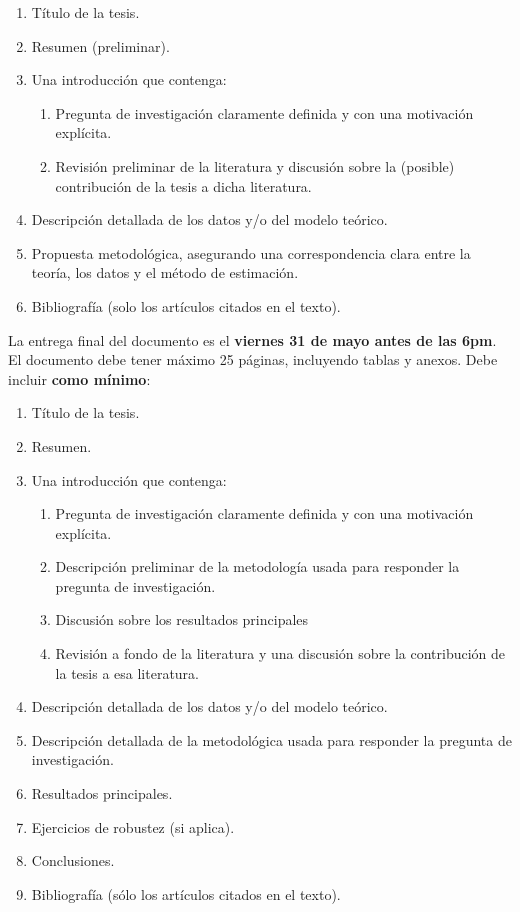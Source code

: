\documentclass[12pt]{article}
\begin{document}
\begin{mdframed}
\begin{enumerate}
    \item Título de la tesis.
    \item Resumen (preliminar).
    \item Una introducción que contenga:
    \begin{enumerate}
        \item Pregunta de investigación claramente definida y con una motivación explícita.
        \item Revisión preliminar de la literatura y discusión sobre la (posible) contribución de la tesis a dicha literatura.
    \end{enumerate}
    \item Descripción detallada de los datos y/o del modelo teórico.
    \item Propuesta metodológica, asegurando una correspondencia clara entre la teoría, los datos y el método de estimación.
    \item Bibliografía (solo los artículos citados en el texto).
\end{enumerate}
\end{mdframed}

La entrega final del documento es el \textbf{viernes 31 de mayo antes de las 6pm}. El documento debe tener máximo 25 páginas, incluyendo tablas y anexos. Debe incluir \textbf{como mínimo}:

\begin{mdframed}
\begin{enumerate}
    \item Título de la tesis.
    \item Resumen.
    \item Una introducción que contenga:
    \begin{enumerate}
        \item Pregunta de investigación claramente definida y con una motivación explícita.
        \item Descripción preliminar de la metodología usada para responder la pregunta de investigación.
        \item Discusión sobre los resultados principales
        \item Revisión a fondo de la literatura y una discusión sobre la contribución de la tesis a esa literatura.
    \end{enumerate}
    \item Descripción detallada de los datos y/o del modelo teórico.
    \item Descripción detallada de la metodológica usada para responder la pregunta de investigación.
    \item Resultados principales.
    \item Ejercicios de robustez (si aplica).    
    \item Conclusiones.
    \item Bibliografía (sólo los artículos citados en el texto).
\end{enumerate}
\end{mdframed}
\end{document}
